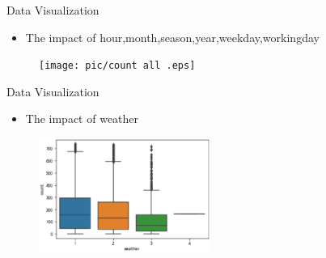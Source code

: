 \documentclass[
 size=14pt,
 paper=smartboard,  %
 mode=present, 		%
 display=slides, 	%
 style=tuliplab,  	%
 pauseslide,
 fleqn,leqno]{powerdot}
\begin{document}
\begin{slide}[toc=,bm=]{Data  Visualization}
  \begin{center}

    {
      \begin{itemize}
          \item The impact of hour,month,season,year,weekday,workingday
      \end{itemize} 
        \begin{figure}
          \centering
          \texttt{[image: pic/count all .eps]}
          \centering
        \end{figure} 
    }
    \end{center}
 


\end{slide}
\begin{slide}[toc=,bm=]{Data  Visualization}
  \begin{center}

    {
      \begin{itemize}
        
          \item The impact of weather
      \end{itemize} 
        \begin{figure}
          \centering
          \includegraphics[width=0.5\textwidth]{pic/weather.eps}
          \centering
        \end{figure} 
    }
    \end{center}
 


\end{slide}
\end{document}
